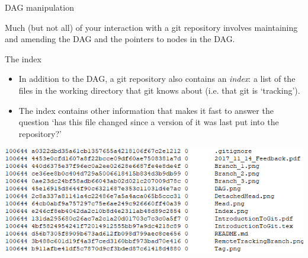 \documentclass[usenames,dvipsnames]{beamer}
\begin{document}
\begin{frame}{DAG manipulation}
  \begin{block}{}
      Much (but not all) of your interaction with a git repository involves maintaining and amending the DAG and the pointers to nodes in the DAG.
  \end{block}
\end{frame}


\begin{frame}{The index}
  \begin{block}{}
    \begin{itemize}
      \item{In addition to the DAG, a git repository also contains an \textit{index}: a list of the files in the working directory that git knows about (i.e. that git is `tracking').}
      \item{The index contains other information that makes it fast to answer the question `has this file changed since a version of it was last put into the repository?'}
    \end{itemize}
    \begin{center}
      \includegraphics[scale=0.55]{Index.png}
    \end{center}
  \end{block}
\end{frame}
\end{document}
